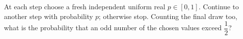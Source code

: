 At each step choose a fresh independent uniform real $p\in[0,1]$. Continue to another step with probability $p$; otherwise stop. Counting the final draw too, what is the probability that an odd number of the chosen values exceed $\dfrac{1}{2}$?
